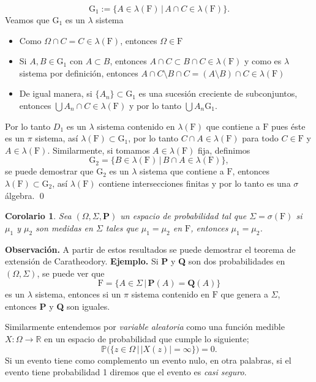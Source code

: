 \documentclass[letterpaper]{article}
\newtheorem{cor}[teorema]{Corolario}
\newcommand{\prob}{\textbf{P}}
\newcommand{\eje}{{\newline \noindent \sc \textbf{Ejemplo. }}}
\newcommand{\obs}{{\newline \noindent \sc \textbf{Observación. }}}
\newcommand{\om}{\ensuremath{\Omega}}
\newcommand{\sig}{\ensuremath{\Sigma}}
\begin{document}
\[
    \mathrm{G}_{1}:=\{A\in\lambda(\mathrm{F})\,\vert\,A\cap C\in\lambda(\mathrm{F})\}.
\]
\noindent Veamos que \(\mathrm{G}_1\) es un \(\lambda\) sistema
\begin{itemize}
\item Como \(\om\cap C=C\in\lambda(\mathrm{F})\), entonces \(\om\in\mathrm{F}\)
\item Si \(A,B\in\mathrm{G}_1\) con \(A\subset B\), entonces \(A\cap C\subset B\cap C\in\lambda(\mathrm{F})\) y como es \(\lambda\) sistema por definición, entonces \(A\cap C\setminus B\cap C=(A\setminus B)\cap C\in\lambda(\mathrm{F})\)
\item De igual manera, si  \(\{A_n\}\subset\mathrm{G}_1\) es una sucesión creciente de subconjuntos, entonces \(\bigcup A_n\cap C\in\lambda(\mathrm{F})\) y por lo tanto \(\bigcup A_n\mathrm{G}_1\).
\end{itemize}
Por lo tanto \(D_1\) es un \(\lambda\) sistema contenido en \(\lambda(\mathrm{F})\) que contiene a \(\mathrm{F}\) pues éste es un \(\pi\) sistema, así \(\lambda(\mathrm{F})\subset\mathrm{G}_1\), por lo tanto \(C\cap A\in\lambda(\mathrm{F})\) para todo \(C\in\mathrm{F}\) y \(A\in\lambda(\mathrm{F})\). Similarmente, si tomamos \(A\in\lambda(\mathrm{F})\) fija, definimos
\[
    \mathrm{G}_2=\{B\in\lambda(\mathrm{F})\,\vert\,B\cap A\in\lambda(\mathrm{F})\},
\]
\noindent se puede demostrar que \(\mathrm{G}_2\) es un \(\lambda\) sistema que contiene a \(\mathrm{F}\), entonces \(\lambda(\mathrm{F})\subset\mathrm{G}_2\), así \(\lambda(\mathrm{F})\) contiene intersecciones finitas y por lo tanto es una \(\sigma\) álgebra.
\qed\\\empty
\begin{cor}
Sea $(\om,\sig,\prob)$ un espacio de probabilidad tal que $\sig=\sigma(\mathrm{F})$ si $\mu_1$ y $\mu_2$ son medidas en $\sig$ tales que $\mu_1=\mu_2$ en $\mathrm{F}$, entonces $\mu_1=\mu_2$.
\end{cor}
\obs A partir de estos resultados se puede demostrar el teorema de extensión de Caratheodory.
\eje Si \textbf{P} y \textbf{Q} son dos probabilidades en \((\Omega,\Sigma)\), se puede ver que
\[
    \mathrm{F}=\{A\in\Sigma\,\vert\,\textbf{P}(A)=\textbf{Q}(A)\}
\]
es un \(\lambda\) sistema, entonces si un \(\pi\) sistema contenido en \(\mathrm{F}\) que genera a \(\Sigma\), entonces \textbf{P} y \textbf{Q} son iguales.

Similarmente entendemos por \emph{variable aleatoria} como una función medible \(X:\Omega\rightarrow\mathbb{R}\) en un espacio de probabilidad que cumple lo siguiente;
\[
    \mathbb{P}\Big(\{z\in\Omega\,\vert\, |X(z)|=\infty\}\Big)=0.
\]
Si un evento tiene como complemento un evento nulo, en otra palabras, si el evento tiene probabilidad 1 diremos que el evento es \emph{casi seguro}.
\end{document}
